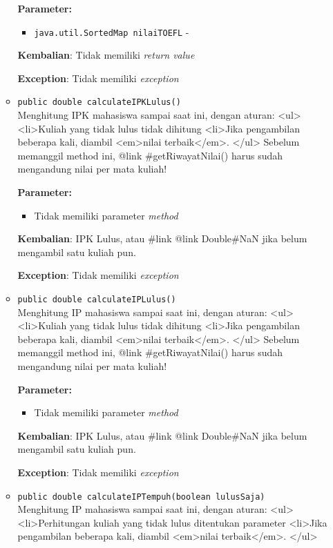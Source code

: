\documentclass{article}
\begin{document}
\begin{enumerate}
\begin{itemize}
\textbf{Parameter:}\begin{itemize}
\item \texttt{java.util.SortedMap nilaiTOEFL} - 
\end{itemize}
\textbf{Kembalian}: Tidak memiliki \textit{return value}

\textbf{Exception}: Tidak memiliki \textit{exception}

\item \texttt{public double calculateIPKLulus()}\\ 
Menghitung IPK mahasiswa sampai saat ini, dengan aturan:
 <ul>
   <li>Kuliah yang tidak lulus tidak dihitung
   <li>Jika pengambilan beberapa kali, diambil <em>nilai terbaik</em>.
 </ul>
 Sebelum memanggil method ini, {@link #getRiwayatNilai()} harus sudah mengandung nilai per mata kuliah!

\textbf{Parameter:}\begin{itemize}
\item Tidak memiliki parameter \textit{method}
\end{itemize}
\textbf{Kembalian}: IPK Lulus, atau {#link {@link Double#NaN}} jika belum mengambil satu kuliah pun.

\textbf{Exception}: Tidak memiliki \textit{exception}

\item \texttt{public double calculateIPLulus()}\\ 
Menghitung IP mahasiswa sampai saat ini, dengan aturan:
 <ul>
   <li>Kuliah yang tidak lulus tidak dihitung
   <li>Jika pengambilan beberapa kali, diambil <em>nilai terbaik</em>.
 </ul>
 Sebelum memanggil method ini, {@link #getRiwayatNilai()} harus sudah mengandung nilai per mata kuliah!

\textbf{Parameter:}\begin{itemize}
\item Tidak memiliki parameter \textit{method}
\end{itemize}
\textbf{Kembalian}: IPK Lulus, atau {#link {@link Double#NaN}} jika belum mengambil satu kuliah pun.

\textbf{Exception}: Tidak memiliki \textit{exception}

\item \texttt{public double calculateIPTempuh(boolean lulusSaja)}\\ 
Menghitung IP mahasiswa sampai saat ini, dengan aturan:
 <ul>
   <li>Perhitungan kuliah yang tidak lulus ditentukan parameter
   <li>Jika pengambilan beberapa kali, diambil <em>nilai terbaik</em>.
 </ul>


\end{itemize}
\end{enumerate}
\end{document}
